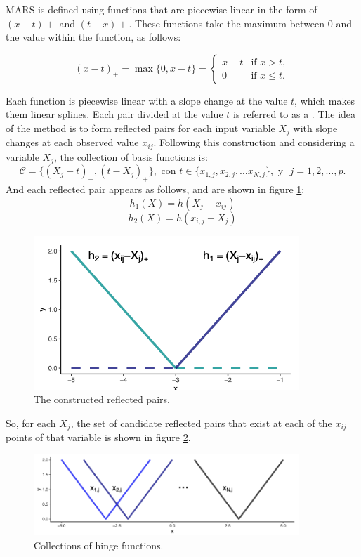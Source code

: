 MARS is defined using functions that are piecewise linear in the form of $(x - t)+$ and $(t - x)+$. These functions take the maximum between 0 and the value within the function, as follows:

$$
(x - t)_+ = \max\{ 0, x - t \}= \begin{cases} 
	x - t &\mbox{if } x > t, \\
	0 & \mbox{if } x \leq t. \end{cases}
$$

Each function is piecewise linear with a slope change at the value $t$, which makes them linear splines. Each pair divided at the value $t$ is referred to as a . The idea of the method is to form reflected pairs for each input variable $X_j$ with slope changes at each observed value $x_{ij}$. Following this construction and considering a variable $X_j$, the collection of basis functions is:
$$
\mathcal{C} = \{ (X_j - t)_+, (t - X_j)_+ \}, \text{ con } t \in \{ x_{1,j}, x_{2,j}, \ldots x_{N,j} \}, \text{ y } \,\, j = 1,2, \ldots , p.
$$
And each reflected pair appears as follows, and are shown in figure \ref{reflected_pairs}: 
$$
h_1(X) = h(X_j - x_{ij}) 
$$
$$
h_2(X) = h(x_{i,j} - X_j)
$$
\begin{figure}[h]
	\includegraphics[width=10cm]{Figures/3ref_pair.png}
	\centering
	\caption{The constructed reflected pairs.}
	\label{reflected_pairs}
\end{figure}
So, for each $X_j$, the set of candidate reflected pairs that exist at each of the $x_{ij}$ points of that variable is shown in figure \ref{hinges}. 
\begin{figure}[h]
	\includegraphics[width=10cm]{Figures/3hinge.png}
	\centering
	\caption{Collections of hinge functions.}
	\label{hinges}
\end{figure}

